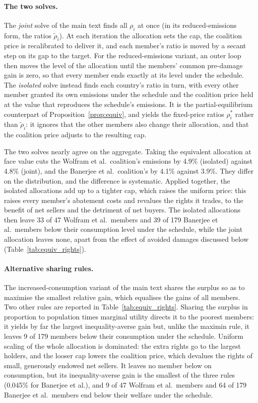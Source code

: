 \documentclass[12pt,english]{article}
\theoremstyle{remark}
\begin{document}
\paragraph{The two solves.} The \emph{joint} solve of the main text finds all $\rho_i$ at once (in its reduced-emissions form, the ratios $\tilde\rho_i$). At each iteration the allocation sets the cap, the coalition price is recalibrated to deliver it, and each member's ratio is moved by a secant step on its gap to the target. For the reduced-emissions variant, an outer loop then moves the level of the allocation until the members' common pre-damage gain is zero, so that every member ends exactly at its level under the schedule. The \emph{isolated} solve instead finds each country's ratio in turn, with every other member granted its own emissions under the schedule and the coalition price held at the value that reproduces the schedule's emissions. It is the partial-equilibrium counterpart of Proposition~\ref{prop:equiv}, and yields the fixed-price ratios $\rho^*_i$ rather than $\tilde\rho_i$: it ignores that the other members also change their allocation, and that the coalition price adjusts to the resulting cap.

The two solves nearly agree on the aggregate. Taking the equivalent allocation at face value cuts the Wolfram et al.\ coalition's emissions by 4.9\% (isolated) against 4.8\% (joint), and the Banerjee et al.\ coalition's by 4.1\% against 3.9\%. They differ on the distribution, and the difference is systematic.
Applied together, the isolated allocations add up to a tighter cap, which raises the uniform price: this raises every member's abatement costs and revalues the rights it trades, to the benefit of net sellers and the detriment of net buyers. The isolated allocations then leave 33 of 47 Wolfram et al.\ members and 39 of 179 Banerjee et al.\ members below their consumption level under the schedule, while the joint allocation leaves none, apart from the effect of avoided damages discussed below (Table~\ref{tab:equiv_rights}).

\paragraph{Alternative sharing rules.} The increased-consumption variant of the main text shares the surplus so as to maximise the smallest relative gain, which equalises the gains of all members. Two other rules are reported in Table~\ref{tab:equiv_rights}. Sharing the surplus in proportion to population times marginal utility directs it to the poorest members: it yields by far the largest inequality-averse gain
but, unlike the maximin rule, it leaves 9 of 179 members below their consumption under the schedule. Uniform scaling of the whole allocation is dominated: the extra rights go to the largest holders, and the looser cap lowers the coalition price, which devalues the rights of small, generously endowed net sellers. It leaves no member below on consumption, but its inequality-averse gain is the smallest of the three rules (0.045\% for Banerjee et al.), and 9 of 47 Wolfram et al.\ members and 64 of 179 Banerjee et al.\ members end below their welfare under the schedule.
\end{document}
